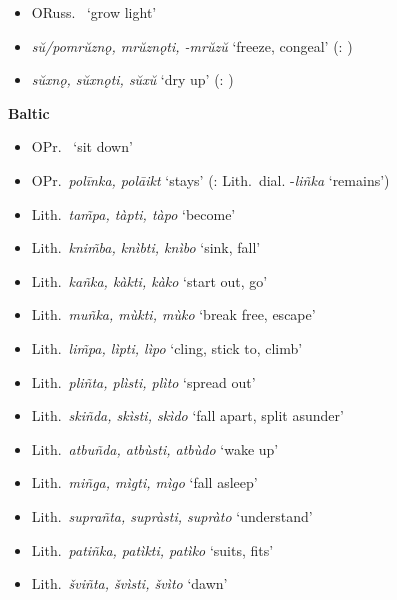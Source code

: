 \documentclass[output=paper,colorlinks,citecolor=brown]{langscibook}
\begin{document}
\begin{exe}
\begin{xlist}
\begin{itemize}
        \item ORuss.\  ‘grow light’
        \item \textit{sŭ/pomrŭznǫ, mrŭznǫti, -mrŭzŭ} ‘freeze, congeal’ (: )
        \item \textit{sŭxnǫ, sŭxnǫti, sŭxŭ} ‘dry up’ (: )
    \end{itemize}
    \ex \textbf{Baltic}
    \largerpage
    \begin{itemize}
        \item OPr.\  ‘sit down’
        \item OPr.\ \textit{polīnka, polāikt} ‘stays’ (: Lith.\ dial. -\textit{liñka} ‘remains’)
        \item Lith.\ \textit{tam̃pa, tàpti, tàpo} ‘become’
        \item Lith.\ \textit{knim̃ba, knìbti, knìbo} ‘sink, fall’
        \item Lith.\ \textit{kañka, kàkti, kàko} ‘start out, go’
        \item Lith.\ \textit{muñka, mùkti, mùko} ‘break free, escape’
        \item Lith.\ \textit{lim̃pa, lìpti, lìpo} ‘cling, stick to, climb’
        \item Lith.\ \textit{pliñta, plìsti, plìto} ‘spread out’
        \item Lith.\ \textit{skiñda, skìsti, skìdo} ‘fall apart, split asunder’
        \item Lith.\ \textit{atbuñda, atbùsti, atbùdo} ‘wake up’
        \item Lith.\ \textit{miñga, mìgti, mìgo} ‘fall asleep’
        \item Lith.\ \textit{suprañta, supràsti, supràto} ‘understand’
        \item Lith.\ \textit{patiñka, patìkti, patìko} ‘suits, fits’
        \item Lith.\ \textit{šviñta, švìsti, švìto} ‘dawn’

\end{itemize}
\end{xlist}
\end{exe}
\end{document}
